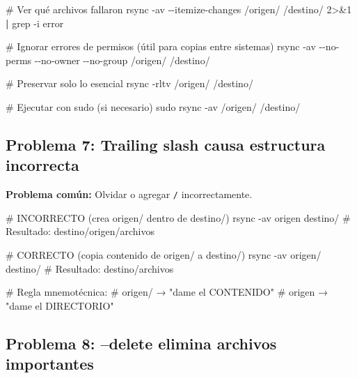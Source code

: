 \documentclass[
  doc,
  floatsintext,
  longtable,
  a4paper,
  nolmodern,
  notxfonts,
  notimes,
  12pt,
  colorlinks=true,linkcolor=blue,citecolor=blue,urlcolor=blue]{apa7}
\newenvironment{Shaded}{\begin{snugshade}}{\end{snugshade}}
\newcommand{\AttributeTok}[1]{\textcolor[rgb]{0.40,0.45,0.13}{#1}}
\newcommand{\CommentTok}[1]{\textcolor[rgb]{0.37,0.37,0.37}{#1}}
\newcommand{\DecValTok}[1]{\textcolor[rgb]{0.68,0.00,0.00}{#1}}
\newcommand{\FunctionTok}[1]{\textcolor[rgb]{0.28,0.35,0.67}{#1}}
\newcommand{\KeywordTok}[1]{\textcolor[rgb]{0.00,0.23,0.31}{\textbf{#1}}}
\newcommand{\NormalTok}[1]{\textcolor[rgb]{0.00,0.23,0.31}{#1}}
\newcommand{\OperatorTok}[1]{\textcolor[rgb]{0.37,0.37,0.37}{#1}}
\begin{document}
\begin{Shaded}
\begin{Highlighting}[]
\CommentTok{\# Ver qué archivos fallaron}
\FunctionTok{rsync} \AttributeTok{{-}av} \AttributeTok{{-}{-}itemize{-}changes}\NormalTok{ /origen/ /destino/ }\DecValTok{2}\OperatorTok{\textgreater{}\&}\DecValTok{1} \KeywordTok{|} \FunctionTok{grep} \AttributeTok{{-}i}\NormalTok{ error}

\CommentTok{\# Ignorar errores de permisos (útil para copias entre sistemas)}
\FunctionTok{rsync} \AttributeTok{{-}av} \AttributeTok{{-}{-}no{-}perms} \AttributeTok{{-}{-}no{-}owner} \AttributeTok{{-}{-}no{-}group}\NormalTok{ /origen/ /destino/}

\CommentTok{\# Preservar solo lo esencial}
\FunctionTok{rsync} \AttributeTok{{-}rltv}\NormalTok{ /origen/ /destino/}

\CommentTok{\# Ejecutar con sudo (si necesario)}
\FunctionTok{sudo}\NormalTok{ rsync }\AttributeTok{{-}av}\NormalTok{ /origen/ /destino/}
\end{Highlighting}
\end{Shaded}

\subsection{Problema 7: Trailing slash causa estructura
incorrecta}\label{problema-7-trailing-slash-causa-estructura-incorrecta}

\textbf{Problema común:} Olvidar o agregar \texttt{/} incorrectamente.

\begin{Shaded}
\begin{Highlighting}[]
\CommentTok{\# INCORRECTO (crea origen/ dentro de destino/)}
\FunctionTok{rsync} \AttributeTok{{-}av}\NormalTok{ origen destino/}
\CommentTok{\# Resultado: destino/origen/archivos}

\CommentTok{\# CORRECTO (copia contenido de origen/ a destino/)}
\FunctionTok{rsync} \AttributeTok{{-}av}\NormalTok{ origen/ destino/}
\CommentTok{\# Resultado: destino/archivos}

\CommentTok{\# Regla mnemotécnica:}
\CommentTok{\# origen/  → "dame el CONTENIDO"}
\CommentTok{\# origen   → "dame el DIRECTORIO"}
\end{Highlighting}
\end{Shaded}

\subsection{Problema 8: --delete elimina archivos
importantes}\label{problema-8-delete-elimina-archivos-importantes}
\end{document}

